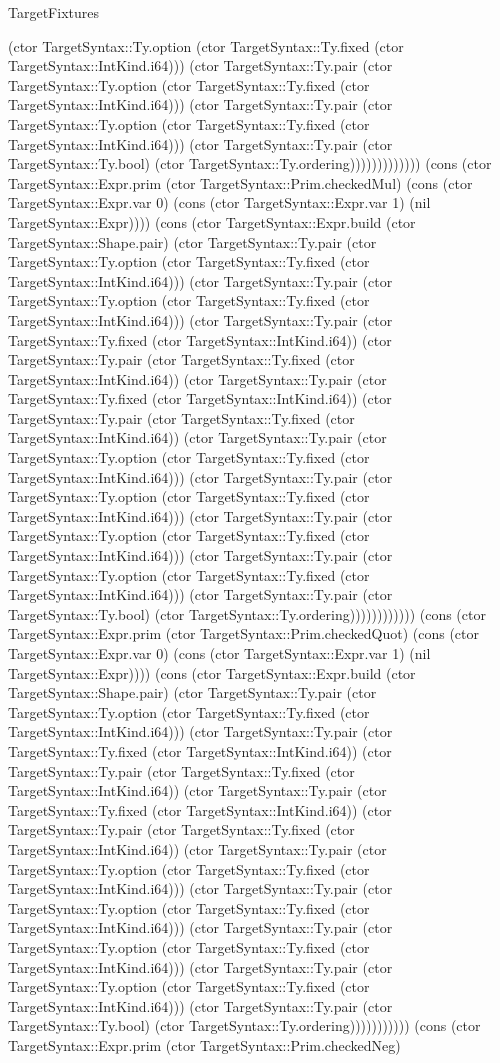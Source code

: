 \begin{lexlean}{TargetFixtures}
\begin{semanticmodule}
{(ctor TargetSyntax::Ty.option (ctor TargetSyntax::Ty.fixed (ctor TargetSyntax::IntKind.i64))) (ctor TargetSyntax::Ty.pair (ctor TargetSyntax::Ty.option (ctor TargetSyntax::Ty.fixed (ctor TargetSyntax::IntKind.i64))) (ctor TargetSyntax::Ty.pair (ctor TargetSyntax::Ty.option (ctor TargetSyntax::Ty.fixed (ctor TargetSyntax::IntKind.i64))) (ctor TargetSyntax::Ty.pair (ctor TargetSyntax::Ty.bool) (ctor TargetSyntax::Ty.ordering))))))))))))) (cons (ctor TargetSyntax::Expr.prim (ctor TargetSyntax::Prim.checkedMul) (cons (ctor TargetSyntax::Expr.var 0) (cons (ctor TargetSyntax::Expr.var 1) (nil TargetSyntax::Expr)))) (cons (ctor TargetSyntax::Expr.build (ctor TargetSyntax::Shape.pair) (ctor TargetSyntax::Ty.pair (ctor TargetSyntax::Ty.option (ctor TargetSyntax::Ty.fixed (ctor TargetSyntax::IntKind.i64))) (ctor TargetSyntax::Ty.pair (ctor TargetSyntax::Ty.option (ctor TargetSyntax::Ty.fixed (ctor TargetSyntax::IntKind.i64))) (ctor TargetSyntax::Ty.pair (ctor TargetSyntax::Ty.fixed (ctor TargetSyntax::IntKind.i64)) (ctor TargetSyntax::Ty.pair (ctor TargetSyntax::Ty.fixed (ctor TargetSyntax::IntKind.i64)) (ctor TargetSyntax::Ty.pair (ctor TargetSyntax::Ty.fixed (ctor TargetSyntax::IntKind.i64)) (ctor TargetSyntax::Ty.pair (ctor TargetSyntax::Ty.fixed (ctor TargetSyntax::IntKind.i64)) (ctor TargetSyntax::Ty.pair (ctor TargetSyntax::Ty.option (ctor TargetSyntax::Ty.fixed (ctor TargetSyntax::IntKind.i64))) (ctor TargetSyntax::Ty.pair (ctor TargetSyntax::Ty.option (ctor TargetSyntax::Ty.fixed (ctor TargetSyntax::IntKind.i64))) (ctor TargetSyntax::Ty.pair (ctor TargetSyntax::Ty.option (ctor TargetSyntax::Ty.fixed (ctor TargetSyntax::IntKind.i64))) (ctor TargetSyntax::Ty.pair (ctor TargetSyntax::Ty.option (ctor TargetSyntax::Ty.fixed (ctor TargetSyntax::IntKind.i64))) (ctor TargetSyntax::Ty.pair (ctor TargetSyntax::Ty.bool) (ctor TargetSyntax::Ty.ordering)))))))))))) (cons (ctor TargetSyntax::Expr.prim (ctor TargetSyntax::Prim.checkedQuot) (cons (ctor TargetSyntax::Expr.var 0) (cons (ctor TargetSyntax::Expr.var 1) (nil TargetSyntax::Expr)))) (cons (ctor TargetSyntax::Expr.build (ctor TargetSyntax::Shape.pair) (ctor TargetSyntax::Ty.pair (ctor TargetSyntax::Ty.option (ctor TargetSyntax::Ty.fixed (ctor TargetSyntax::IntKind.i64))) (ctor TargetSyntax::Ty.pair (ctor TargetSyntax::Ty.fixed (ctor TargetSyntax::IntKind.i64)) (ctor TargetSyntax::Ty.pair (ctor TargetSyntax::Ty.fixed (ctor TargetSyntax::IntKind.i64)) (ctor TargetSyntax::Ty.pair (ctor TargetSyntax::Ty.fixed (ctor TargetSyntax::IntKind.i64)) (ctor TargetSyntax::Ty.pair (ctor TargetSyntax::Ty.fixed (ctor TargetSyntax::IntKind.i64)) (ctor TargetSyntax::Ty.pair (ctor TargetSyntax::Ty.option (ctor TargetSyntax::Ty.fixed (ctor TargetSyntax::IntKind.i64))) (ctor TargetSyntax::Ty.pair (ctor TargetSyntax::Ty.option (ctor TargetSyntax::Ty.fixed (ctor TargetSyntax::IntKind.i64))) (ctor TargetSyntax::Ty.pair (ctor TargetSyntax::Ty.option (ctor TargetSyntax::Ty.fixed (ctor TargetSyntax::IntKind.i64))) (ctor TargetSyntax::Ty.pair (ctor TargetSyntax::Ty.option (ctor TargetSyntax::Ty.fixed (ctor TargetSyntax::IntKind.i64))) (ctor TargetSyntax::Ty.pair (ctor TargetSyntax::Ty.bool) (ctor TargetSyntax::Ty.ordering))))))))))) (cons (ctor TargetSyntax::Expr.prim (ctor TargetSyntax::Prim.checkedNeg) }
\end{semanticmodule}
\end{lexlean}
